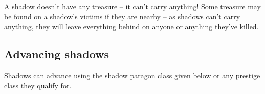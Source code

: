 \documentclass[10pt]{article}
\begin{document}
A shadow doesn't have any treasure -- it can't carry anything! Some treasure may be found on a shadow's victims if they are nearby -- as shadows can't carry anything, they will leave everything behind on anyone or anything they've killed.

\subsection{Advancing shadows}

Shadows can advance using the shadow paragon class given below or any prestige class they qualify for.

\end{document}
